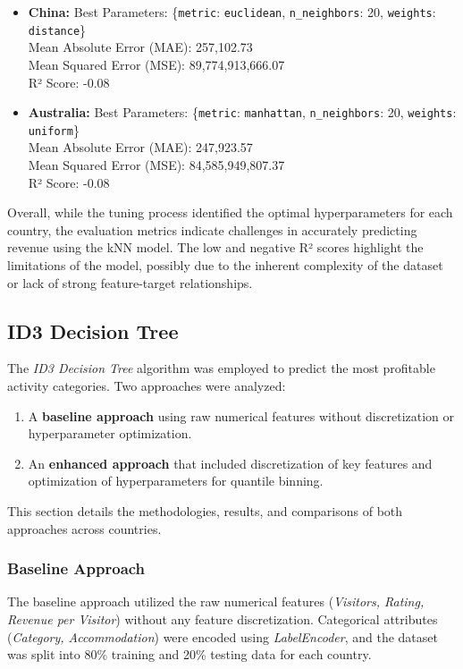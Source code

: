 \documentclass{article}
\begin{document}
\begin{itemize}
    \item \textbf{China:}
    Best Parameters: \{\texttt{metric}: \texttt{euclidean}, \texttt{n\_neighbors}: 20, \texttt{weights}: \texttt{distance}\} \\
    Mean Absolute Error (MAE): 257,102.73 \\
    Mean Squared Error (MSE): 89,774,913,666.07 \\
    R² Score: -0.08 \\

    \item \textbf{Australia:}
    Best Parameters: \{\texttt{metric}: \texttt{manhattan}, \texttt{n\_neighbors}: 20, \texttt{weights}: \texttt{uniform}\} \\
    Mean Absolute Error (MAE): 247,923.57 \\
    Mean Squared Error (MSE): 84,585,949,807.37 \\
    R² Score: -0.08 \\
\end{itemize}

Overall, while the tuning process identified the optimal hyperparameters for each country, the evaluation metrics indicate challenges in accurately predicting revenue using the kNN model. The low and negative R² scores highlight the limitations of the model, possibly due to the inherent complexity of the dataset or lack of strong feature-target relationships.


\subsection{ID3 Decision Tree}
The \textit{ID3 Decision Tree} algorithm was employed to predict the most profitable activity categories. Two approaches were analyzed:
\begin{enumerate}
    \item A \textbf{baseline approach} using raw numerical features without discretization or hyperparameter optimization.
    \item An \textbf{enhanced approach} that included discretization of key features and optimization of hyperparameters for quantile binning.
\end{enumerate}
This section details the methodologies, results, and comparisons of both approaches across countries.

\subsubsection{Baseline Approach}
The baseline approach utilized the raw numerical features (\textit{Visitors, Rating, Revenue per Visitor}) without any feature discretization. Categorical attributes (\textit{Category, Accommodation}) were encoded using \textit{LabelEncoder}, and the dataset was split into 80\% training and 20\% testing data for each country.
\end{document}

